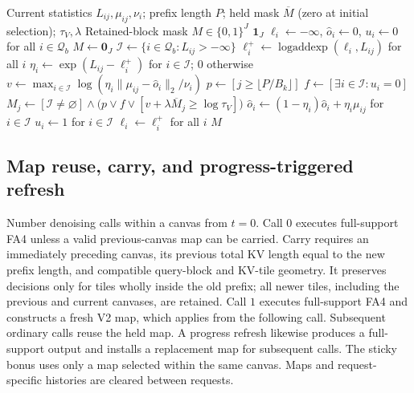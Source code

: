 \begin{algorithm}[t]
\caption{V2 selection for one layer, query head, and query block}
\label{alg:v2-selector}
\small
\begin{algorithmic}[1]
\Require Current statistics $L_{ij},\mu_{ij},\nu_i$; prefix length $P$;
held mask $\overline M$ (zero at initial selection); $\tau_V,\lambda$
\Ensure Retained-block mask $M\in\{0,1\}^{J}$
    \State \Return $\boldsymbol 1_J$ 
\EndIf
\State $\ell_i\gets-\infty$, $\widehat o_i\gets0$, $u_i\gets0$ for all $i\in\mathcal Q_b$
\State $M\gets\boldsymbol 0_J$
    \State $\mathcal I\gets\{i\in\mathcal Q_b:L_{ij}>-\infty\}$
    \State $\ell_i^+\gets\operatorname{logaddexp}(\ell_i,L_{ij})$ for all $i$
    \State $\eta_i\gets\exp(L_{ij}-\ell_i^+)$ for $i\in\mathcal I$; $0$ otherwise
    \State $v\gets\displaystyle\max_{i\in\mathcal I}
        \log\!\left(\eta_i\|\mu_{ij}-\widehat o_i\|_2/\nu_i\right)$
        \Comment{$\max\varnothing=-\infty$}
    \State $p\gets[j\ge\lfloor P/B_k\rfloor]$
    \State $f\gets[\exists i\in\mathcal I:u_i=0]$
    \State $M_j\gets[\mathcal I\ne\varnothing]\land
        \bigl(p\lor f\lor[v+\lambda\overline M_j\ge\log\tau_V]\bigr)$
        \State $\widehat o_i\gets(1-\eta_i)\widehat o_i+\eta_i\mu_{ij}$ for $i\in\mathcal I$
        \State $u_i\gets1$ for $i\in\mathcal I$
    \EndIf
    \State $\ell_i\gets\ell_i^+$ for all $i$ 
\EndFor
\State \Return $M$
\end{algorithmic}
\end{algorithm}

\subsection{Map reuse, carry, and progress-triggered refresh}
\label{sec:v2-reuse}

Number denoising calls within a canvas from $t=0$. Call $0$ executes
full-support FA4 unless a valid previous-canvas map can be carried. Carry
requires an immediately preceding canvas, its previous total KV length
equal to the new prefix length, and compatible query-block and KV-tile
geometry. It preserves decisions only for tiles wholly inside the old
prefix; all newer tiles, including the previous and current canvases, are
retained. Call $1$ executes full-support FA4 and constructs a fresh V2 map,
which applies from the following call. Subsequent ordinary calls reuse the
held map. A progress refresh likewise produces a full-support output and
installs a replacement map for subsequent calls. The sticky bonus uses
only a map selected within the same canvas. Maps and request-specific
histories are cleared between requests.

